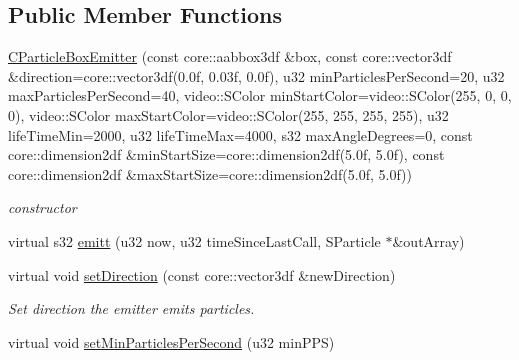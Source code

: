 \subsection*{Public Member Functions}
\begin{DoxyCompactItemize}
\item 
\hypertarget{classirr_1_1scene_1_1_c_particle_box_emitter_ade8138b1554120245767815889a7826a}{\hyperlink{classirr_1_1scene_1_1_c_particle_box_emitter_ade8138b1554120245767815889a7826a}{C\-Particle\-Box\-Emitter} (const core\-::aabbox3df \&box, const core\-::vector3df \&direction=core\-::vector3df(0.\-0f, 0.\-03f, 0.\-0f), u32 min\-Particles\-Per\-Second=20, u32 max\-Particles\-Per\-Second=40, video\-::\-S\-Color min\-Start\-Color=video\-::\-S\-Color(255, 0, 0, 0), video\-::\-S\-Color max\-Start\-Color=video\-::\-S\-Color(255, 255, 255, 255), u32 life\-Time\-Min=2000, u32 life\-Time\-Max=4000, s32 max\-Angle\-Degrees=0, const core\-::dimension2df \&min\-Start\-Size=core\-::dimension2df(5.\-0f, 5.\-0f), const core\-::dimension2df \&max\-Start\-Size=core\-::dimension2df(5.\-0f, 5.\-0f))}\label{classirr_1_1scene_1_1_c_particle_box_emitter_ade8138b1554120245767815889a7826a}

\begin{DoxyCompactList}\small\item\em constructor \end{DoxyCompactList}\item 
virtual s32 \hyperlink{classirr_1_1scene_1_1_c_particle_box_emitter_ab80b12473a21b3d18b369d6b6662e069}{emitt} (u32 now, u32 time\-Since\-Last\-Call, S\-Particle $\ast$\&out\-Array)
\item 
\hypertarget{classirr_1_1scene_1_1_c_particle_box_emitter_a4f8214d2beb772db7ba80dc3103ed7d7}{virtual void \hyperlink{classirr_1_1scene_1_1_c_particle_box_emitter_a4f8214d2beb772db7ba80dc3103ed7d7}{set\-Direction} (const core\-::vector3df \&new\-Direction)}\label{classirr_1_1scene_1_1_c_particle_box_emitter_a4f8214d2beb772db7ba80dc3103ed7d7}

\begin{DoxyCompactList}\small\item\em Set direction the emitter emits particles. \end{DoxyCompactList}\item 
\hypertarget{classirr_1_1scene_1_1_c_particle_box_emitter_a411f97e43433564c3085eb6b3e3fd880}{virtual void \hyperlink{classirr_1_1scene_1_1_c_particle_box_emitter_a411f97e43433564c3085eb6b3e3fd880}{set\-Min\-Particles\-Per\-Second} (u32 min\-P\-P\-S)}\label{classirr_1_1scene_1_1_c_particle_box_emitter_a411f97e43433564c3085eb6b3e3fd880}


\end{DoxyCompactItemize}
